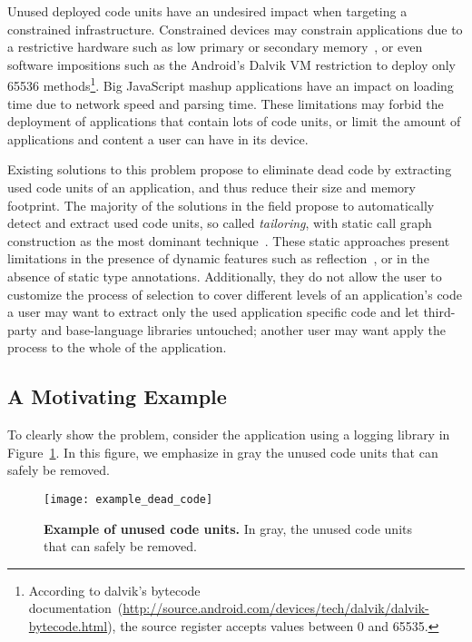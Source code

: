 Unused deployed code units have an undesired impact when targeting a constrained infrastructure. 
Constrained devices may constrain applications due to a restrictive hardware such as low primary or secondary memory~\cite{Mart12a}, or even software impositions such as the Android's Dalvik VM restriction to deploy only 65536 methods\footnote{According to dalvik's bytecode documentation~(\url{http://source.android.com/devices/tech/dalvik/dalvik-bytecode.html}), the source register accepts values between 0 and 65535.}. Big JavaScript mashup applications have an impact on loading time due to network speed and parsing time.
These limitations may forbid the deployment of applications that contain lots of code units, or limit the amount of applications and content a user can have in its device.

Existing solutions to this problem propose to eliminate dead code by extracting used code units of an application, and thus reduce their size and memory footprint. The majority of the solutions in the field propose to automatically detect and extract used code units, so called \emph{tailoring}, with static call graph construction as the most dominant technique~\cite{Grov97a}. 
These static approaches present limitations in the presence of dynamic features such as reflection~\cite{Livs05a}, or in the absence of static type annotations. Additionally, they do not allow the user to customize the process of selection to cover different levels of an application's code \ie a user may want to extract only the used application specific code and let third-party and base-language libraries untouched; another user may want apply the process to the whole of the application.


\subsection{A Motivating Example} \label{sec:example_intro}

To clearly show the problem, consider the application using a logging library in Figure~\ref{fig:example_dead_code}. In this figure, we emphasize in gray the unused code units that can safely be removed.

\begin{figure}[ht]
\begin{center}
\texttt{[image: example\_dead\_code]}
\caption{\small\textbf{Example of unused code units.} In gray, the unused code units that can safely be removed.\label{fig:example_dead_code}}
\end{center}
\end{figure}

